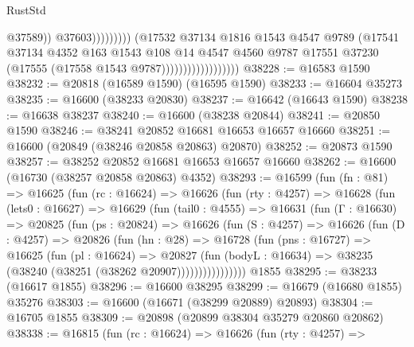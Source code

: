 \begin{lexlean}{RustStd}
\begin{coremodule}
                                                      @37589))
                                                  @37603)))))))))
                                (@17532
                                  @37134
                                  @1816
                                  @1543
                                  @4547
                                  @9789
                                  (@17541
                                    @37134
                                    @4352
                                    @163
                                    @1543
                                    @108
                                    @14
                                    @4547
                                    @4560
                                    @9787
                                    @17551
                                    @37230
                                    (@17555 (@17558 @1543 @9787))))))))))))))))))
@38228 := @16583 @1590
@38232 := @20818 (@16589 @1590) (@16595 @1590)
@38233 := @16604 @35273
@38235 := @16600 (@38233 @20830)
@38237 := @16642 (@16643 @1590)
@38238 := @16638 @38237
@38240 := @16600 (@38238 @20844)
@38241 := @20850 @1590
@38246 := @38241 @20852 @16681 @16653 @16657 @16660
@38251 := @16600 (@20849 (@38246 @20858 @20863) @20870)
@38252 := @20873 @1590
@38257 := @38252 @20852 @16681 @16653 @16657 @16660
@38262 := @16600 (@16730 (@38257 @20858 @20863) @4352)
@38293 := @16599
    (fun (fn : @81) =>
    @16625
      (fun (rc : @16624) =>
      @16626
        (fun (rty : @4257) =>
        @16628
          (fun (lets0 : @16627) =>
          @16629
            (fun (tail0 : @4555) =>
            @16631
              (fun (Γ : @16630) =>
              @20825
                (fun (ps : @20824) =>
                @16626
                  (fun (S : @4257) =>
                  @16626
                    (fun (D : @4257) =>
                    @20826
                      (fun (hn : @28) =>
                      @16728
                        (fun (pns : @16727) =>
                        @16625
                          (fun (pl : @16624) =>
                          @20827
                            (fun (bodyL : @16634) =>
                            @38235 (@38240 (@38251 (@38262 @20907))))))))))))))))
    @1855
@38295 := @38233 (@16617 @1855)
@38296 := @16600 @38295
@38299 := @16679 (@16680 @1855) @35276
@38303 := @16600 (@16671 (@38299 @20889) @20893)
@38304 := @16705 @1855
@38309 := @20898 (@20899 @38304 @35279 @20860 @20862)
@38338 := @16815
    (fun (rc : @16624) =>
    @16626
      (fun (rty : @4257) =>

\end{coremodule}
\end{lexlean}
